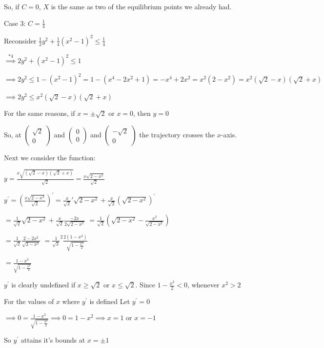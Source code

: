 \documentclass{article}
\begin{document}
So, if $C = 0$, $X$ is the same as two of the equilibrium points we
already had.
\newpage

Case 3: $C = \frac{1}{4}$

Reconsider $\frac{1}{2}y^2 +\frac{1}{4}(x^2 -1)^2 \leq \frac{1}{4}$

$\stackrel{*4}{\implies} 2y^2 +(x^2 -1)^2 \leq 1$

$\stackrel{}{\implies} 2y^2 \leq 1 -(x^2 -1)^2 = 1 -(x^4-2x^2+1) =
-x^4+2x^2 = x^2(2-x^2) = x^2(\sqrt{2} -x)(\sqrt{2} + x)$

$\implies 2y^2\leq x^2 (\sqrt{2} -x)(\sqrt{2} + x)$

For the same reasons, if $x = \pm \sqrt{2}$ or $x=0$, then $y=0$

So, at $\begin{pmatrix}\sqrt{2}\\0\end{pmatrix}$ and
$\begin{pmatrix}0\\0\end{pmatrix}$ and
$\begin{pmatrix}-\sqrt{2}\\0\end{pmatrix}$ the trajectory crosses the
$x$-axis.

Next we consider the function:

$y =  \frac{x\sqrt{(\sqrt{2} -x)(\sqrt{2} + x)}}{\sqrt{2}} = \frac{x\sqrt{2 -x^2}}{\sqrt{2}}$

$y^\prime = (\frac{x\sqrt{2 -x^2}}{\sqrt{2}})^\prime =
\frac{x}{\sqrt{2}}\prime\sqrt{2 -x^2} + \frac{x}{\sqrt{2}}(\sqrt{2 -x^2})^\prime$

$= \frac{1}{\sqrt{2}}\sqrt{2 -x^2} + \frac{x}{\sqrt{2}}
\frac{-2x}{2\sqrt{2 -x^2}}$
$= \frac{1}{\sqrt{2}} (\sqrt{2 -x^2} -\frac{x^2}{\sqrt{2 -x^2}})$

$= \frac{1}{\sqrt{2}}\frac{2 -2x^2}{\sqrt{2 -x^2}}$
$= \frac{1}{\sqrt{2}}^2\frac{2(1 -x^2)}{\sqrt{1 -\frac{x^2}{2}}}$

$= \frac{1 -x^2}{\sqrt{1 -\frac{x^2}{2}}}$

$y^\prime$ is clearly undefined if $x \geq\sqrt{2}$ or $x\leq
\sqrt{2}$. Since $1 -\frac{x^2}{2}< 0$, whenever $x^2 > 2$

For the values of $x$ where $y^\prime$ is defined Let $y^\prime = 0$

$\implies 0 = \frac{1 -x^2}{\sqrt{1 -\frac{x^2}{2}}} \implies 0 = 1 - x^2 \implies x=1 $ or $x= -1$

So $y^\prime$ attains it's bounds at $x=\pm 1$
\end{document}

